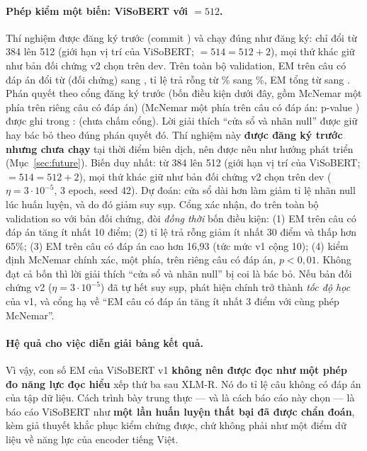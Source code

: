 \paragraph{Phép kiểm một biến: ViSoBERT với  $= 512$.}
\ifhasVisoLong
Thí nghiệm được đăng ký trước (commit ) và chạy đúng như đăng ký: chỉ đổi
 từ 384 lên 512 (giới hạn vị trí của ViSoBERT; 
$= 514 = 512 + 2$), mọi thứ khác giữ như bản đối chứng v2 chọn trên dev. Trên toàn bộ validation,
EM trên câu có đáp án đổi từ \visoHasAnsEM{} (đối chứng) sang \visoLongHasAnsEM{}, tỉ lệ trả rỗng
từ \visoEmptyRate\% sang \visoLongEmptyRate\%, EM tổng từ \visoEM{} sang \visoLongEM. Phán quyết
theo cổng đăng ký trước (bốn điều kiện dưới đây, gồm McNemar một phía trên riêng câu có đáp án)
(McNemar một phía trên câu có đáp án: p-value \visoLongMcnemarP) được
 ghi trong \ifdefined\visoLongVerdict{}:
\textbf{\visoLongVerdict}\else{} (chưa chấm cổng)\fi. Lời giải thích ``cửa sổ và nhãn null'' được
giữ hay bác bỏ theo đúng phán quyết đó.
\else
Thí nghiệm này \textbf{được đăng ký trước nhưng chưa chạy} tại thời điểm biên dịch, nên được nêu
như hướng phát triển (Mục~\ref{sec:future}). Biến duy nhất:  từ 384 lên 512
(giới hạn vị trí của ViSoBERT;  $= 514 = 512 + 2$), mọi thứ khác
giữ như bản đối chứng v2 chọn trên dev ($\eta = 3\cdot10^{-5}$, 3 epoch, seed 42). Dự đoán: cửa sổ
dài hơn làm giảm tỉ lệ nhãn null lúc huấn luyện, và do đó giảm suy sụp. Cổng xác nhận, đo trên
toàn bộ validation so với bản đối chứng, đòi \emph{đồng thời} bốn điều kiện: (1) EM trên câu có
đáp án tăng ít nhất 10 điểm; (2) tỉ lệ trả rỗng giảm ít nhất 30 điểm và thấp hơn 65\%; (3) EM
trên câu có đáp án cao hơn 16,93 (tức mức v1 cộng 10); (4) kiểm định McNemar chính xác, một phía,
trên riêng câu có đáp án, $p < 0{,}01$. Không đạt cả bốn thì lời giải thích ``cửa sổ và nhãn
null'' bị coi là bác bỏ. Nếu bản đối chứng v2 ($\eta = 3\cdot10^{-5}$) đã tự hết suy sụp, phát
hiện chính trở thành \emph{tốc độ học} của v1, và cổng hạ về ``EM câu có đáp án tăng ít nhất 3
điểm với cùng phép McNemar''.
\fi

\paragraph{Hệ quả cho việc diễn giải bảng kết quả.} Vì vậy, con số EM \histVisoEM{} của ViSoBERT v1
\textbf{không nên được đọc như một phép đo năng lực đọc hiểu} xếp thứ ba sau XLM-R. Nó đo tỉ lệ
câu không có đáp án của tập dữ liệu. Cách trình bày trung thực --- và là cách báo cáo này chọn ---
là báo cáo ViSoBERT như \textbf{một lần huấn luyện thất bại đã được chẩn đoán}, kèm giả thuyết
khắc phục kiểm chứng được, chứ không phải như một điểm dữ liệu về năng lực của encoder tiếng Việt.

